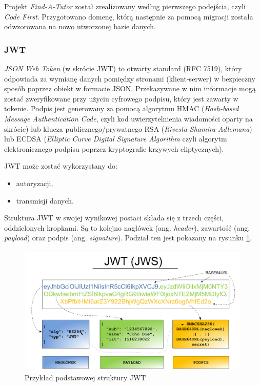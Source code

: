 \documentclass[12pt]{article}
\numberwithin{figure}{section}
\begin{document}
\begin{sloppypar}
Projekt \textit{Find-A-Tutor} został zrealizowany według pierwszego podejścia, czyli \textit{Code First}. Przygotowano domenę, którą następnie za pomocą migracji została odwzorowana na nowo utworzonej bazie danych. 

\subsubsection{JWT}
\textit{JSON Web Token} (w skrócie JWT) to otwarty standard (RFC 7519), który odpowiada za wymianę danych pomiędzy stronami (klient-serwer) w bezpieczny sposób poprzez obiekt w formacie JSON. Przekazywane w nim informacje mogą zostać zweryfikowane przy użyciu cyfrowego podpisu, który jest zawarty w tokenie. Podpis jest generowany za pomocą algorytmu HMAC (\textit{Hash-based Message Authentication Code}, czyli kod uwierzytelnienia wiadomości oparty na skrócie) lub klucza publicznego/prywatnego RSA (\textit{Rivesta-Shamira-Adlemana}) lub ECDSA (\textit{Elliptic Curve Digital Signature Algorithm} czyli algorytm elektronicznego podpisu poprzez kryptografie krzywych eliptycznych).
    
JWT może zostać wykorzystany do:
\begin{itemize}
    \item autoryzacji,
    \item transmisji danych.
\end{itemize}
    
Struktura JWT w swojej wynikowej postaci składa się z trzech części, oddzielonych kropkami. Są to kolejno nagłówek (ang. \textit{header}), zawartość (ang. \textit{payload}) oraz podpis (ang. \textit{signature}). Podział ten jest pokazany na rysunku \ref{fig:jwt}.
    
\begin{figure}[H] 
    \centering
    \includegraphics[width=1\textwidth]{images/chapter_3/jwt.png}
    \caption{Przykład podstawowej struktury JWT \cite{sekurak-jwt}}
    \label{fig:jwt}
\end{figure}
    

\end{sloppypar}
\end{document}
